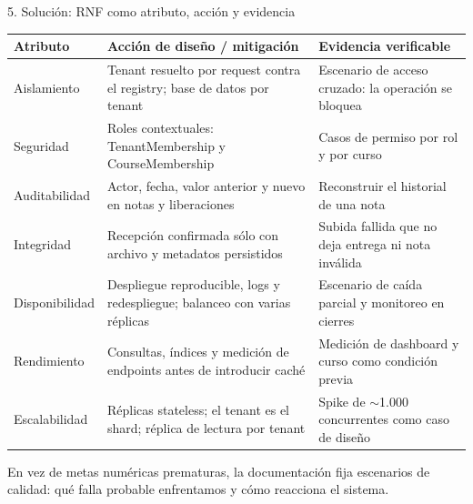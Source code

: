 \documentclass[aspectratio=169,10pt]{beamer}
\begin{document}
\begin{frame}[t]{5. Solución: RNF como atributo, acción y evidencia}
\small
\vspace{0.2cm}
\begin{tabularx}{\textwidth}{lYY}
\toprule
\textbf{Atributo} & \textbf{Acción de diseño / mitigación} & \textbf{Evidencia verificable} \\
\midrule
Aislamiento & Tenant resuelto por request contra el registry; base de datos por tenant & Escenario de acceso cruzado: la operación se bloquea \\
Seguridad & Roles contextuales: TenantMembership y CourseMembership & Casos de permiso por rol y por curso \\
Auditabilidad & Actor, fecha, valor anterior y nuevo en notas y liberaciones & Reconstruir el historial de una nota \\
Integridad & Recepción confirmada sólo con archivo y metadatos persistidos & Subida fallida que no deja entrega ni nota inválida \\
Disponibilidad & Despliegue reproducible, logs y redespliegue; balanceo con varias réplicas & Escenario de caída parcial y monitoreo en cierres \\
Rendimiento & Consultas, índices y medición de endpoints antes de introducir caché & Medición de dashboard y curso como condición previa \\
Escalabilidad & Réplicas stateless; el tenant es el shard; réplica de lectura por tenant & Spike de $\sim$1.000 concurrentes como caso de diseño \\
\bottomrule
\end{tabularx}
\vspace{0.15cm}
{\footnotesize En vez de metas numéricas prematuras, la documentación fija escenarios de calidad: qué falla probable enfrentamos y cómo reacciona el sistema.}
\end{frame}
\end{document}
